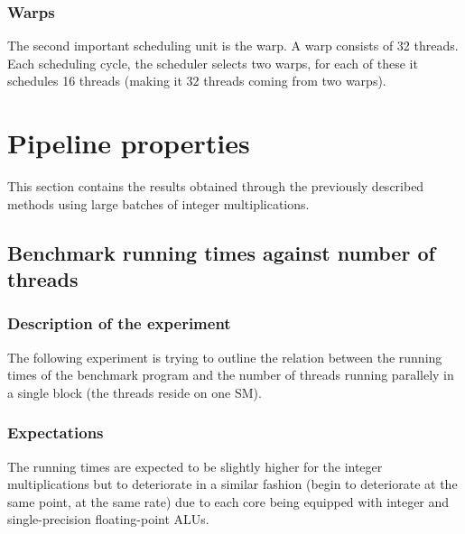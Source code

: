 \documentclass{article}
\begin{document}
        \subsubsection{Warps}
        The second important scheduling unit is the warp. A warp consists
        of 32 threads. Each scheduling cycle, the scheduler selects two
        warps, for each of these it schedules 16 threads (making it 32
        threads coming from two warps).

\section{Pipeline properties}
	This section contains the results obtained through the previously described
	methods using large batches of integer multiplications.

	\subsection{Benchmark running times against number of threads}
	\label{par:pipeline_exp}
	\subsubsection{Description of the experiment}
	The following experiment is trying to outline the relation between the running
    times of the benchmark program and the number of threads running parallely in
    a single block (the threads reside on one SM).
	\subsubsection{Expectations}
    The running times are expected to be slightly higher for the integer
    multiplications but to deteriorate in a similar fashion (begin to deteriorate
    at the same point, at the same rate) due to each core being equipped with
    integer and single-precision floating-point ALUs.
    
\end{document}
